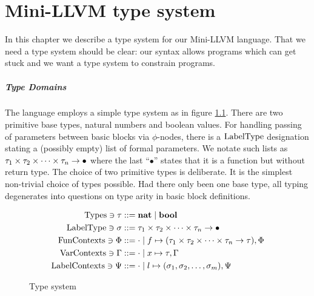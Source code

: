 \documentclass[a4paper, oneside, 10pt, final]{memoir}
\begin{document}
\chapter{Mini-LLVM type system}
\label{chap:type-system}

In this chapter we describe a type system for our Mini-LLVM
language. That we need a type system should be clear: our syntax
allows programs which can get stuck and we want a type system to
constrain programs.

\paragraph{Type Domains} The language employs a simple type system as in
figure \ref{fig:type-system}. There are two primitive base types,
natural numbers and boolean values. For handling passing of parameters
between basic blocks via $\phi$-nodes, there is a $\mathrm{Label Type}$
designation stating a (possibly empty) list of formal parameters. We
notate such lists as $\tau_1 \times \tau_2 \times \dotsb \times \tau_n -> \bullet$ where the last
``$\bullet$'' states that it is a function but without return type.
The choice of two primitive types is deliberate. It is the simplest
non-trivial choice of types possible. Had there only been one base
type, all typing degenerates into questions on type arity in basic
block definitions.

\begin{figure}
  \begin{align*}
    \mathrm{Types} \ni \tau & ::= \mathbf{nat} \; \vert \; \mathbf{bool} \\
    \mathrm{Label Type} \ni \sigma   & ::= \tau_1 \times \tau_2 \times \dotsb \times \tau_n -> \bullet\\
    \mathrm{Fun Contexts} \ni \Phi & ::= \cdot \; \vert \; f \mapsto (\tau_1 \times \tau_2 \times \dotsb \times \tau_n -> \tau), \Phi \\
    \mathrm{Var Contexts} \ni \Gamma & ::= \cdot \; \vert \; x \mapsto \tau,\Gamma\\
    \mathrm{Label Contexts} \ni \Psi   & ::= \cdot \; \vert \; l \mapsto (\sigma_1, \sigma_2, \dotsc, \sigma_m),\Psi
  \end{align*}
  \caption{Type system}
  \label{fig:type-system}
\end{figure}

\newcommand{\tpr}{|-_{\mathrm{r}}}
\newcommand{\tpc}{|-_{\mathrm{c}}}
\newcommand{\tpop}{|-_{\mathrm{o}}}
\newcommand{\tpb}{|-_{\mathrm{b}}}
\end{document}
